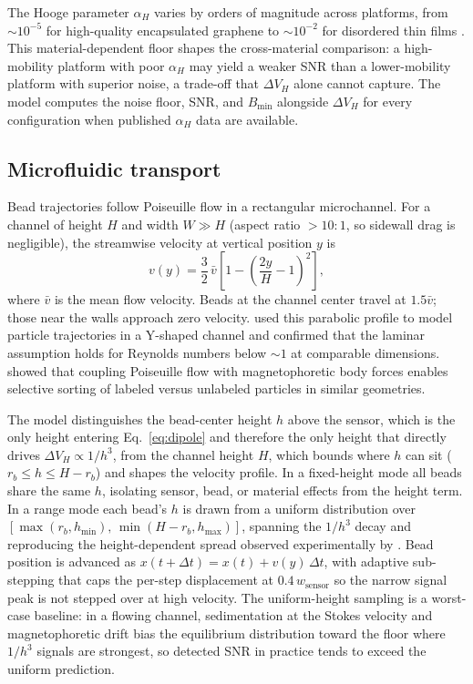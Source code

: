 \documentclass[pdflatex,sn-basic]{sn-jnl}
\theoremstyle{thmstyleone}
\theoremstyle{thmstyletwo}
\theoremstyle{thmstylethree}
\begin{document}
The Hooge parameter $\alpha_H$ varies by orders of magnitude across platforms, from ${\sim}10^{-5}$ for high-quality encapsulated graphene to ${\sim}10^{-2}$ for disordered thin films \citep{xu2013,huang2014}. This material-dependent floor shapes the cross-material comparison: a high-mobility platform with poor $\alpha_H$ may yield a weaker SNR than a lower-mobility platform with superior noise, a trade-off that $\Delta V_H$ alone cannot capture. The model computes the noise floor, SNR, and $B_\text{min}$ alongside $\Delta V_H$ for every configuration when published $\alpha_H$ data are available.

\subsection{Microfluidic transport}\label{sec:transport}

Bead trajectories follow Poiseuille flow in a rectangular microchannel. For a channel of height $H$ and width $W \gg H$ (aspect ratio ${>}10{:}1$, so sidewall drag is negligible), the streamwise velocity at vertical position $y$ is
\begin{equation}
v(y) = \frac{3}{2}\,\bar{v}\left[1 - \left(\frac{2y}{H} - 1\right)^2\right],
\label{eq:poiseuille}
\end{equation}
where $\bar{v}$ is the mean flow velocity. Beads at the channel center travel at $1.5\bar{v}$; those near the walls approach zero velocity. \citet{hewlin2023} used this parabolic profile to model particle trajectories in a Y-shaped channel and confirmed that the laminar assumption holds for Reynolds numbers below ${\sim}1$ at comparable dimensions. \citet{khashan2024} showed that coupling Poiseuille flow with magnetophoretic body forces enables selective sorting of labeled versus unlabeled particles in similar geometries.

The model distinguishes the bead-center height $h$ above the sensor, which is the only height entering Eq.~\eqref{eq:dipole} and therefore the only height that directly drives $\Delta V_H \propto 1/h^3$, from the channel height $H$, which bounds where $h$ can sit ($r_b \le h \le H - r_b$) and shapes the velocity profile. In a fixed-height mode all beads share the same $h$, isolating sensor, bead, or material effects from the height term. In a range mode each bead's $h$ is drawn from a uniform distribution over $[\max(r_b, h_{\min}),\, \min(H - r_b, h_{\max})]$, spanning the $1/h^3$ decay and reproducing the height-dependent spread observed experimentally by \citet{aledealat2009}. Bead position is advanced as $x(t+\Delta t) = x(t) + v(y)\,\Delta t$, with adaptive sub-stepping that caps the per-step displacement at $0.4\, w_{\text{sensor}}$ so the narrow signal peak is not stepped over at high velocity. The uniform-height sampling is a worst-case baseline: in a flowing channel, sedimentation at the Stokes velocity and magnetophoretic drift bias the equilibrium distribution toward the floor where $1/h^3$ signals are strongest, so detected SNR in practice tends to exceed the uniform prediction.
\end{document}

